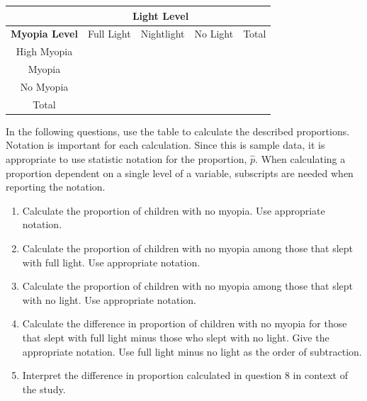 \documentclass[
]{report}
\begin{document}
\begin{center}
\begingroup
\setlength{\tabcolsep}{14pt} %
\renewcommand{\arraystretch}{2} %
\begin{tabular}{|c|c|c|c|c|}
\hline
 & \multicolumn{3}{|c|}{\textbf{Light Level}} & \\ \hline
\textbf{Myopia Level} & Full Light & Nightlight & No Light & Total \\ \hline
 High Myopia & & & & \\ \hline
 Myopia & & & & \\ \hline
 No Myopia & & & & \\ \hline
 Total & & & & \\ \hline  
\end{tabular}
\endgroup
\end{center}

In the following questions, use the table to calculate the described proportions. Notation is important for each calculation. Since this is sample data, it is appropriate to use statistic notation for the proportion, \(\hat{p}\). When calculating a proportion dependent on a single level of a variable, subscripts are needed when reporting the notation.

\begin{enumerate}
\def\labelenumi{\arabic{enumi}.}
\setcounter{enumi}{4}
\item
  Calculate the proportion of children with no myopia. Use appropriate notation.
  \vspace{0.3in}
\item
  Calculate the proportion of children with no myopia among those that slept with full light. Use appropriate notation.
  \vspace{0.3in}
\item
  Calculate the proportion of children with no myopia among those that slept with no light. Use appropriate notation.
  \vspace{0.3in}
\item
  Calculate the difference in proportion of children with no myopia for those that slept with full light minus those who slept with no light. Give the appropriate notation. Use full light minus no light as the order of subtraction.
  \vspace{0.4in}
\item
  Interpret the difference in proportion calculated in question 8 in context of the study.
\end{enumerate}

\vspace{0.5in}
\end{document}
